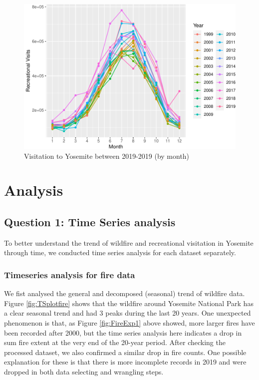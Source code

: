 \documentclass[
  12pt,
]{article}
\begin{document}
\begin{figure}
\centering
\includegraphics{CodeFinal_files/figure-latex/VisitDataExp2-1.pdf}
\caption{\label{fig:VisitDataExp2}Visitation to Yosemite between 2019-2019 (by month)}
\end{figure}

\newpage

\hypertarget{analysis}{%
\section{Analysis}\label{analysis}}

\hypertarget{question-1-time-series-analysis}{%
\subsection{Question 1: Time Series analysis}\label{question-1-time-series-analysis}}

To better understand the trend of wildfire and recreational visitation in Yosemite through time, we conducted time series analysis for each dataset separately.

\hypertarget{timeseries-analysis-for-fire-data}{%
\subsubsection{Timeseries analysis for fire data}\label{timeseries-analysis-for-fire-data}}

We fist analysed the general and decomposed (seasonal) trend of wildfire data.
Figure \ref{fig:TSplotfire} shows that the wildfire around Yosemite National Park has a clear seasonal trend and had 3 peaks during the last 20 years. One unexpected phenomenon is that, as Figure \ref{fig:FireExp1} above showed, more larger fires have been recorded after 2000, but the time series analysis here indicates a drop in sum fire extent at the very end of the 20-year period. After checking the processed dataset, we also confirmed a similar drop in fire counts. One possible explanation for these is that there is more incomplete records in 2019 and were dropped in both data selecting and wrangling steps.
\end{document}
